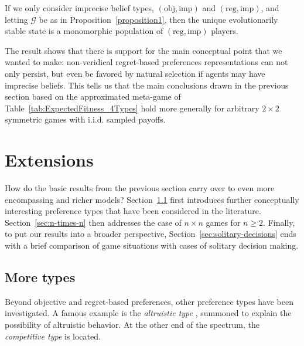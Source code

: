\documentclass[fleqn,reqno,11pt]{article}
\begin{document}
\begin{corollary} \label{corollary1} If we only consider imprecise belief types, $(\text{obj}, \text{imp})$ and
  $(\text{reg}, \text{imp})$, and letting $\mathcal{G}$ be as in Proposition~\ref{proposition1}, then the unique evolutionarily stable state is a monomorphic population of
  $(\text{reg}, \text{imp})$ players.
\end{corollary}

The result shows that there is support for the main conceptual
point that we wanted to make: 
non-veridical regret-based preferences representations can not only persist, but even be favored by
natural selection if agents may have imprecise beliefs.
This
tells us that the main conclusions drawn in the previous section based on the approximated meta-game of Table~\ref{tab:ExpectedFitness_4Types} hold more generally 
for
arbitrary $2 \times 2$ symmetric games with i.i.d. sampled payoffs.

\section{Extensions}
\label{sec:extensions}

How do the basic results from the previous section carry over to even more encompassing and richer
models? Section~\ref{sec:more-types} first introduces further conceptually interesting
preference types that have been considered in the literature. Section~\ref{sec:n-times-n} then addresses the case of $n \times n$ games for
$n \ge 2$. Finally, to put our results into a broader perspective,
Section~\ref{sec:solitary-decisions} ends with a brief comparison of game situations with cases
of solitary decision making.

\subsection{More types}
\label{sec:more-types}


Beyond objective and regret-based preferences, other preference types have been investigated. A
famous example is the \textit{altruistic type} \citep[e.g.,][]{Beck76,BestGuth98}, summoned to
explain the possibility of altruistic behavior. At the other end of the spectrum, the \emph{competitive
type} is located. 
\end{document}
